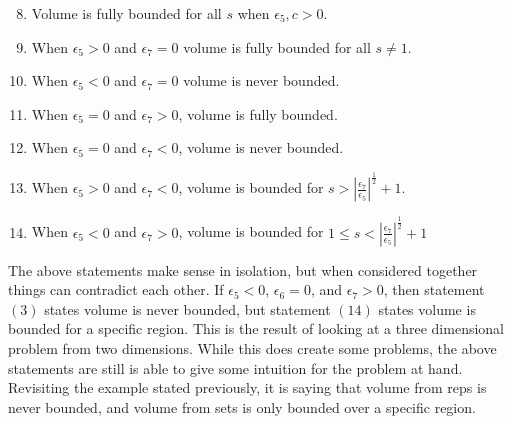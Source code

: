 \begin{enumerate}
    \setcounter{enumi}{7}
    \item Volume is fully bounded for all $s$ when $\epsilon_5,c>0$.
    \item When $\epsilon_5>0$ and $\epsilon_7=0$ volume is fully bounded for all $s\ne 1$.
    \item When $\epsilon_5<0$ and $\epsilon_7=0$ volume is never bounded.
    \item When $\epsilon_5=0$ and $\epsilon_7>0$, volume is fully bounded.
    \item When $\epsilon_5=0$ and $\epsilon_7<0$, volume is never bounded.
    \item When $\epsilon_5>0$ and $\epsilon_7<0$, volume is bounded for $s>\left| \frac{\epsilon_7}{\epsilon_5} \right|^\frac{1}{2}+1$.
    \item When $\epsilon_5<0$ and $\epsilon_7>0$, volume is bounded for $1\le s < \left| \frac{\epsilon_7}{\epsilon_5} \right|^\frac{1}{2}+1$
\end{enumerate}

%

The above statements make sense in isolation, but when considered together things can contradict each other. If $\epsilon_5<0$, $\epsilon_6=0$, and $\epsilon_7>0$, then  statement $(3)$ states volume is never bounded, but statement $(14)$ states volume is bounded for a specific region. This is the result of looking at a three dimensional problem from two dimensions. While this does create some problems, the above statements are still is able to give some intuition for the problem at hand. Revisiting the example stated previously, it is saying that volume from reps is never bounded, and volume from sets is only bounded over a specific region.

